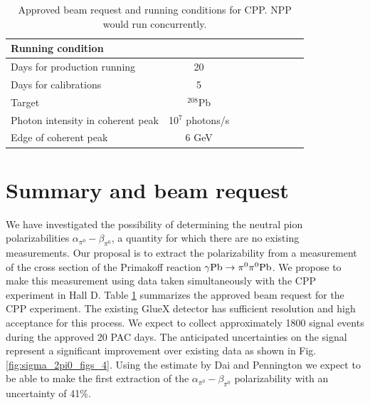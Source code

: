 \begin{table}[hbt]
\caption{Approved beam request and running conditions for CPP. NPP would run concurrently.
\label{request}
}
\begin{center}
\begin{tabular}{|l|c|c|c|c|c|c|c|c|}
\hline
\hline
  Running condition  &            \\ \hline
  Days for production running  &   20   \\ \hline
  Days for calibrations &  5       \\ \hline
  Target   & $^{208}$Pb   \\ \hline
  Photon intensity in coherent peak &   10$^7$ photons/s     \\ \hline
  Edge of coherent peak  &  6 GeV   \\ \hline
 \hline
 \hline
\end{tabular}
\end{center}
\end{table}
 
\section{Summary and beam request}
We have investigated the possibility of determining the neutral pion
polarizabilities $\alpha_{\pi^0}-\beta_{\pi^0}$, a quantity for which there are no existing measurements.
Our proposal is to extract the polarizability from a 
measurement of the cross section of the Primakoff reaction $\gamma
\rm{Pb}\rightarrow \pi^0 \pi^0 \rm{Pb}$. We propose to make this
measurement using data taken simultaneously with the CPP\cite{CPPexp}
experiment in Hall D. Table \ref{request} summarizes the approved beam request for the CPP experiment.
The existing GlueX detector has sufficient
resolution and high acceptance for this process. We expect to collect approximately 1800 signal events during the
approved 20 PAC days. The anticipated   uncertainties on
the signal represent a significant improvement over existing data as shown in Fig.\,\ref{fig:sigma_2pi0_figs_4}.
Using the estimate by Dai and Pennington \cite{Dai:2016ytz} we expect to be able to make the first extraction of the 
$\alpha_{\pi^0}-\beta_{\pi^0}$ polarizability with an uncertainty of 41\%.

